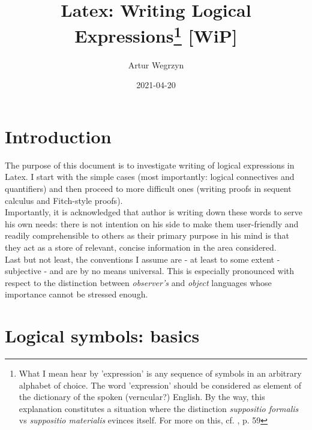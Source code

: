 \documentclass[12pt]{article}
\begin{document}
\title{Latex: Writing Logical Expressions\footnote{What I mean hear by 'expression' is any sequence of symbols in an arbitrary alphabet of choice. The word 'expression' should be considered as element of the dictionary of the spoken (verncular?) English. By the way, this explanation constitutes a situation where the distinction \textit{suppositio formalis} vs \textit{suppositio materialis} evinces itself. For more on this, cf. \cite{tarski_intro}, p. 59}  [WiP]}
\author{Artur Wegrzyn}
\date{2021-04-20}
\maketitle
\tableofcontents

\section{Introduction}
The purpose of this document is to investigate writing of logical expressions in Latex. I start with the simple cases (most importantly: logical connectives and quantifiers) and then proceed to more difficult ones (writing proofs in sequent calculus and Fitch-style proofs). 
\\  \indent Importantly, it is acknowledged that author is writing down these words to serve his own needs: there is not intention on his side to make them user-friendly and readily comprehensible to others as their primary purpose in his mind is that they act as a store of relevant, concise information in the area considered.
\\ \indent Last but not least, the conventions I assume are - at least to some extent - subjective - and are by no means universal. This is especially pronounced with respect to the distinction between \textit{observer's} and \textit{object} languages whose importance cannot be stressed enough.
\section{Logical symbols: basics}
\end{document}
